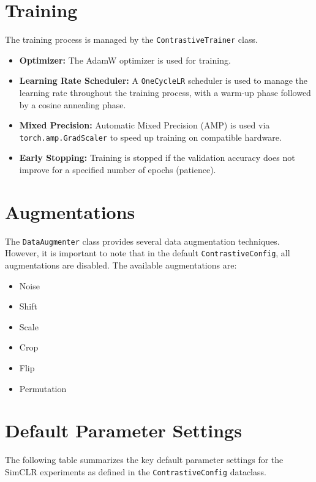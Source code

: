 \documentclass{article}
\begin{document}
\section{Training}
The training process is managed by the \texttt{ContrastiveTrainer} class.
\begin{itemize}
    \item \textbf{Optimizer:} The AdamW optimizer is used for training.
    \item \textbf{Learning Rate Scheduler:} A \texttt{OneCycleLR} scheduler is used to manage the learning rate throughout the training process, with a warm-up phase followed by a cosine annealing phase.
    \item \textbf{Mixed Precision:} Automatic Mixed Precision (AMP) is used via \texttt{torch.amp.GradScaler} to speed up training on compatible hardware.
    \item \textbf{Early Stopping:} Training is stopped if the validation accuracy does not improve for a specified number of epochs (patience).
\end{itemize}

\section{Augmentations}
The \texttt{DataAugmenter} class provides several data augmentation techniques. However, it is important to note that in the default \texttt{ContrastiveConfig}, all augmentations are disabled. The available augmentations are:
\begin{itemize}
    \item Noise
    \item Shift
    \item Scale
    \item Crop
    \item Flip
    \item Permutation
\end{itemize}

\section{Default Parameter Settings}
The following table summarizes the key default parameter settings for the SimCLR experiments as defined in the \texttt{ContrastiveConfig} dataclass.
\end{document}
